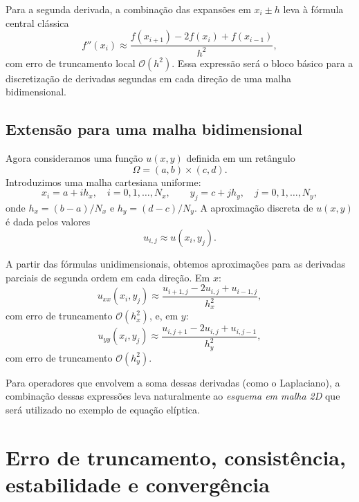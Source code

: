 Para a segunda derivada, a combinação das expansões em $x_i \pm h$
leva à fórmula central clássica
\begin{equation}
    f''(x_i) \approx \frac{f(x_{i+1}) - 2f(x_i) + f(x_{i-1})}{h^2},
\end{equation}
com erro de truncamento local $\mathcal{O}(h^2)$. Essa expressão será o 
bloco básico para a discretização de derivadas segundas em cada direção de 
uma malha bidimensional.

\subsection{Extensão para uma malha bidimensional}

Agora consideramos uma função $u(x,y)$ definida em um retângulo
\begin{equation}
    \Omega = (a,b) \times (c,d).
\end{equation}
Introduzimos uma malha cartesiana uniforme:
\begin{equation}
    x_i = a + i h_x, \quad i = 0,1,\dots,N_x,
    \qquad
    y_j = c + j h_y, \quad j = 0,1,\dots,N_y,
\end{equation}
onde $h_x = (b-a)/N_x$ e $h_y = (d-c)/N_y$. A aproximação discreta de 
$u(x,y)$ é dada pelos valores
\begin{equation}
    u_{i,j} \approx u(x_i,y_j).
\end{equation}

A partir das fórmulas unidimensionais, obtemos aproximações para as 
derivadas parciais de segunda ordem em cada direção. Em $x$:
\begin{equation}
    u_{xx}(x_i,y_j) \approx 
    \frac{u_{i+1,j} - 2u_{i,j} + u_{i-1,j}}{h_x^2},
\end{equation}
com erro de truncamento $\mathcal{O}(h_x^2)$, e, em $y$:
\begin{equation}
    u_{yy}(x_i,y_j) \approx 
    \frac{u_{i,j+1} - 2u_{i,j} + u_{i,j-1}}{h_y^2},
\end{equation}
com erro de truncamento $\mathcal{O}(h_y^2)$.

Para operadores que envolvem a soma dessas derivadas (como o Laplaciano),
a combinação dessas expressões leva naturalmente ao \emph{esquema em malha 2D}
que será utilizado no exemplo de equação elíptica.

\section{Erro de truncamento, consistência, estabilidade e convergência}

